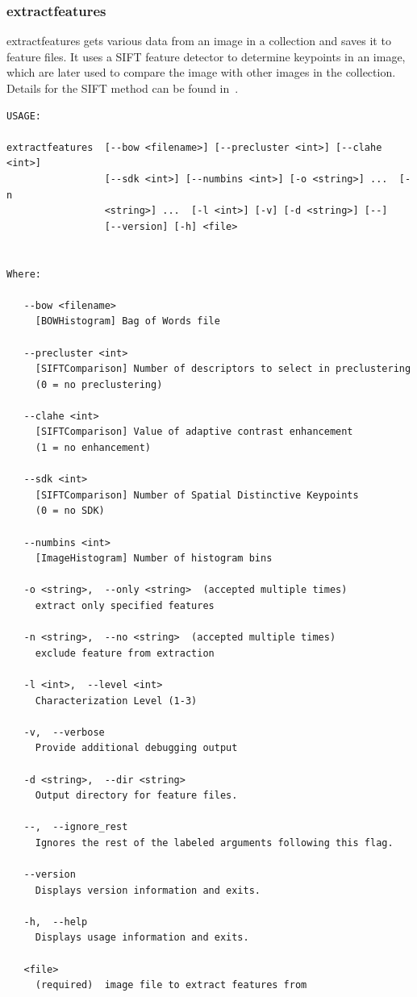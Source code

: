 \subsubsection{extractfeatures}

{\ttfamily extractfeatures} gets various data from an image in a collection
and saves it to feature files.
It uses a SIFT feature detector to determine keypoints in an image, which are 
later used to compare the image with other images in the collection. Details
for the SIFT method can be found in~\cite{lowe}.

\begin{verbatim}
USAGE: 

extractfeatures  [--bow <filename>] [--precluster <int>] [--clahe <int>]
                 [--sdk <int>] [--numbins <int>] [-o <string>] ...  [-n
                 <string>] ...  [-l <int>] [-v] [-d <string>] [--]
                 [--version] [-h] <file>


Where: 

   --bow <filename>
     [BOWHistogram] Bag of Words file

   --precluster <int>
     [SIFTComparison] Number of descriptors to select in preclustering 
	 (0 = no preclustering)

   --clahe <int>
     [SIFTComparison] Value of adaptive contrast enhancement 
	 (1 = no enhancement)

   --sdk <int>
     [SIFTComparison] Number of Spatial Distinctive Keypoints 
	 (0 = no SDK)

   --numbins <int>
     [ImageHistogram] Number of histogram bins

   -o <string>,  --only <string>  (accepted multiple times)
     extract only specified features

   -n <string>,  --no <string>  (accepted multiple times)
     exclude feature from extraction

   -l <int>,  --level <int>
     Characterization Level (1-3)

   -v,  --verbose
     Provide additional debugging output

   -d <string>,  --dir <string>
     Output directory for feature files.

   --,  --ignore_rest
     Ignores the rest of the labeled arguments following this flag.

   --version
     Displays version information and exits.

   -h,  --help
     Displays usage information and exits.

   <file>
     (required)  image file to extract features from
\end{verbatim}

